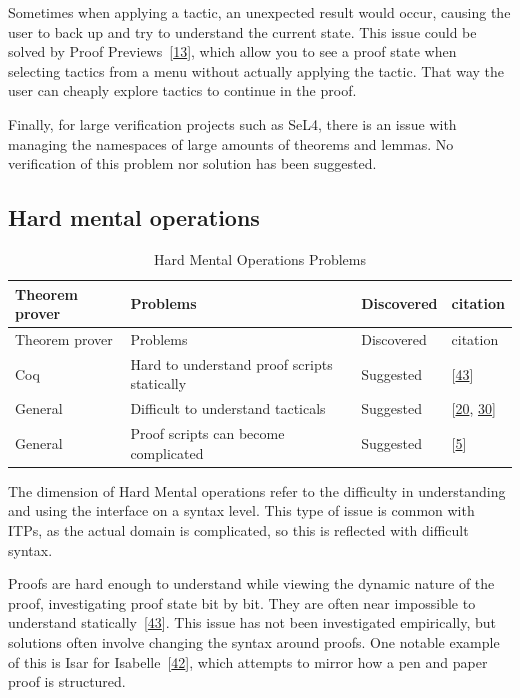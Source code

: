 \documentclass[
]{article}
\begin{document}
Sometimes when applying a tactic, an unexpected result would occur,
causing the user to back up and try to understand the current state.
This issue could be solved by Proof
Previews~{[}\protect\hyperlink{ref-berman_development_2014}{13}{]},
which allow you to see a proof state when selecting tactics from a menu
without actually applying the tactic. That way the user can cheaply
explore tactics to continue in the proof.

Finally, for large verification projects such as SeL4, there is an issue
with managing the namespaces of large amounts of theorems and lemmas. No
verification of this problem nor solution has been suggested.

\hypertarget{hard-mental-operations-1}{%
\subsection{Hard mental operations}\label{hard-mental-operations-1}}

\hypertarget{tbl:hard_mental_operations}{}
\begin{longtable}[]{@{}llll@{}}
\caption{\label{tbl:hard_mental_operations}Hard Mental Operations
Problems}\tabularnewline
\toprule
Theorem prover & Problems & Discovered & citation \\
\midrule
\endfirsthead
\toprule
Theorem prover & Problems & Discovered & citation \\
\midrule
\endhead
Coq & Hard to understand proof scripts statically & Suggested &
{[}\protect\hyperlink{ref-zacchiroli_user_2007}{43}{]} \\
General & Difficult to understand tacticals & Suggested &
{[}\protect\hyperlink{ref-grov_tinker_2018}{20},
\protect\hyperlink{ref-lin_understanding_2016}{30}{]} \\
General & Proof scripts can become complicated & Suggested &
{[}\protect\hyperlink{ref-aspinall_towards_2016}{5}{]} \\
\bottomrule
\end{longtable}

The dimension of Hard Mental operations refer to the difficulty in
understanding and using the interface on a syntax level. This type of
issue is common with ITPs, as the actual domain is complicated, so this
is reflected with difficult syntax.

Proofs are hard enough to understand while viewing the dynamic nature of
the proof, investigating proof state bit by bit. They are often near
impossible to understand
statically~{[}\protect\hyperlink{ref-zacchiroli_user_2007}{43}{]}. This
issue has not been investigated empirically, but solutions often involve
changing the syntax around proofs. One notable example of this is Isar
for Isabelle~{[}\protect\hyperlink{ref-wenzel_structured_2006}{42}{]},
which attempts to mirror how a pen and paper proof is structured.
\end{document}
